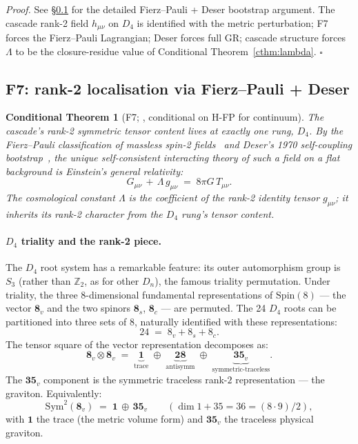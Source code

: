 \documentclass[11pt]{article}
\theoremstyle{plain}
\newtheorem{conditional}[theorem]{Conditional Theorem}
\theoremstyle{definition}
\theoremstyle{remark}
\newcommand{\Sym}{\mathrm{Sym}}
\begin{document}
\noindent\emph{Proof.} See \S\ref{sec:gravity-F7} for the detailed Fierz--Pauli + Deser bootstrap argument. The cascade rank-2 field $h_{\mu\nu}$ on $D_4$ is identified with the metric perturbation; F7 forces the Fierz--Pauli Lagrangian; Deser forces full GR; cascade structure forces $\Lambda$ to be the closure-residue value of Conditional Theorem~\ref{cthm:lambda}. \hfill$\square$

\subsection{F7: rank-2 localisation via Fierz--Pauli + Deser}\label{sec:gravity-F7}

\begin{conditional}[F7; \citealp{SmartXXXVI}, conditional on H-FP for continuum]\label{thm:F7}
The cascade's rank-2 symmetric tensor content lives at exactly one rung, $D_4$. By the Fierz--Pauli classification of massless spin-2 fields~\citep{FierzPauli1939} and Deser's 1970 self-coupling bootstrap~\citep{Deser1970}, the unique self-consistent interacting theory of such a field on a flat background is Einstein's general relativity:
\[
  G_{\mu\nu} \,+\, \Lambda\, g_{\mu\nu} \;=\; 8\pi G\, T_{\mu\nu}.
\]
The cosmological constant $\Lambda$ is the coefficient of the rank-2 identity tensor $g_{\mu\nu}$; it inherits its rank-2 character from the $D_4$ rung's tensor content.
\end{conditional}

\paragraph{$D_4$ triality and the rank-2 piece.}
The $D_4$ root system has a remarkable feature: its outer automorphism group is $S_3$ (rather than $\mathbb{Z}_2$, as for other $D_n$), the famous triality permutation. Under triality, the three 8-dimensional fundamental representations of $\mathrm{Spin}(8)$ --- the vector $\mathbf{8}_v$ and the two spinors $\mathbf{8}_s$, $\mathbf{8}_c$ --- are permuted. The 24 $D_4$ roots can be partitioned into three sets of 8, naturally identified with these representations:
\[
  24 \;=\; 8_v + 8_s + 8_c.
\]
The tensor square of the vector representation decomposes as:
\begin{equation}\label{eq:triality-tensor-square}
  \mathbf{8}_v \otimes \mathbf{8}_v \;=\; \underbrace{\mathbf{1}}_{\text{trace}} \;\oplus\; \underbrace{\mathbf{28}}_{\text{antisymm}} \;\oplus\; \underbrace{\mathbf{35}_v}_{\text{symmetric-traceless}}.
\end{equation}
The $\mathbf{35}_v$ component is the symmetric traceless rank-$2$ representation --- the graviton. Equivalently:
\[
  \Sym^2(\mathbf{8}_v) \;=\; \mathbf{1} \,\oplus\, \mathbf{35}_v
  \qquad (\dim 1 + 35 = 36 = (8 \cdot 9)/2),
\]
with $\mathbf{1}$ the trace (the metric volume form) and $\mathbf{35}_v$ the traceless physical graviton.
\end{document}
